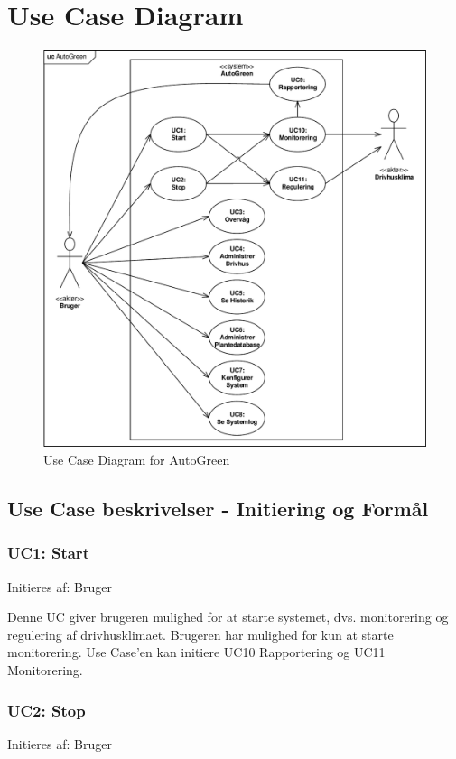 \section{Use Case Diagram}
\begin{figure}[h]
\centering 
\includegraphics[width={\textwidth-1cm}, trim=0 0 0 0, clip=true] {../fig/UC_Diagram.pdf}
\caption{Use Case Diagram for AutoGreen}
\label{fig:use_case_diagram}
\end{figure}

\clearpage

\subsection{Use Case beskrivelser - Initiering og Formål} 
\subsubsection{UC1: Start}
Initieres af: Bruger

Denne UC giver brugeren mulighed for at starte systemet, dvs. monitorering og regulering af drivhusklimaet. 
Brugeren har mulighed for kun at starte monitorering. Use Case’en kan initiere UC10 Rapportering og UC11 Monitorering.

\subsubsection{UC2: Stop}
Initieres af: Bruger

